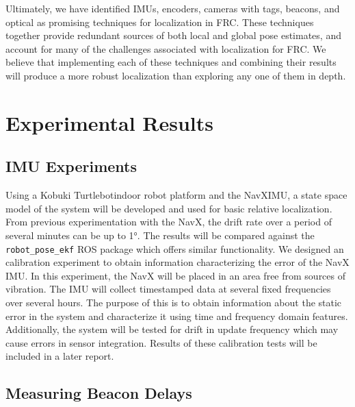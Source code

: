 \documentclass{article}
\begin{document}
  Ultimately, we have identified IMUs, encoders, cameras with tags, beacons, and optical as promising techniques for localization in FRC. These techniques together provide redundant sources of both local and global pose estimates, and account for many of the challenges associated with localization for FRC. We believe that implementing each of these techniques and combining their results will produce a more robust localization than exploring any one of them in depth.

\section{Experimental Results} \label{experiments}

  \subsection{IMU Experiments}
    Using a Kobuki Turtlebot\texttrademark indoor robot platform and the NavX\texttrademark IMU, a state space model of the system will be developed and used for basic relative localization. From previous experimentation with the NavX, the drift rate over a period of several minutes can be up to \ang{1}. The results will be compared against the \texttt{robot\_pose\_ekf} ROS package which offers similar functionality. We designed an calibration experiment to obtain information characterizing the error of the NavX IMU. In this experiment, the NavX will be placed in an area free from sources of vibration. The IMU will collect timestamped data at several fixed frequencies over several hours. The purpose of this is to obtain information about the static error in the system and characterize it using time and frequency domain features. Additionally, the system will be tested for drift in update frequency which may cause errors in sensor integration. Results of these calibration tests will be included in a later report.

  \subsection{Measuring Beacon Delays}
\end{document}
